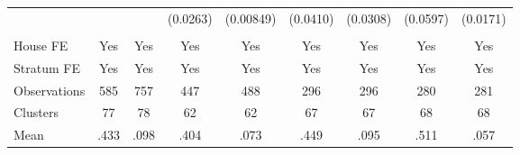 {\begin{tabular}{l*{8}{c}}
                &         &         & (0.0263)&(0.00849)& (0.0410)& (0.0308)& (0.0597)& (0.0171)\\
                &         &         &         &         &         &         &         &         \\
House FE        &      Yes&      Yes&      Yes&      Yes&      Yes&      Yes&      Yes&      Yes\\
Stratum FE      &      Yes&      Yes&      Yes&      Yes&      Yes&      Yes&      Yes&      Yes\\
\midrule
Observations    &      585&      757&      447&      488&      296&      296&      280&      281\\
Clusters        &       77&       78&       62&       62&       67&       67&       68&       68\\
Mean            &     .433&     .098&     .404&     .073&     .449&     .095&     .511&     .057\\
\bottomrule
\end{tabular}
}
